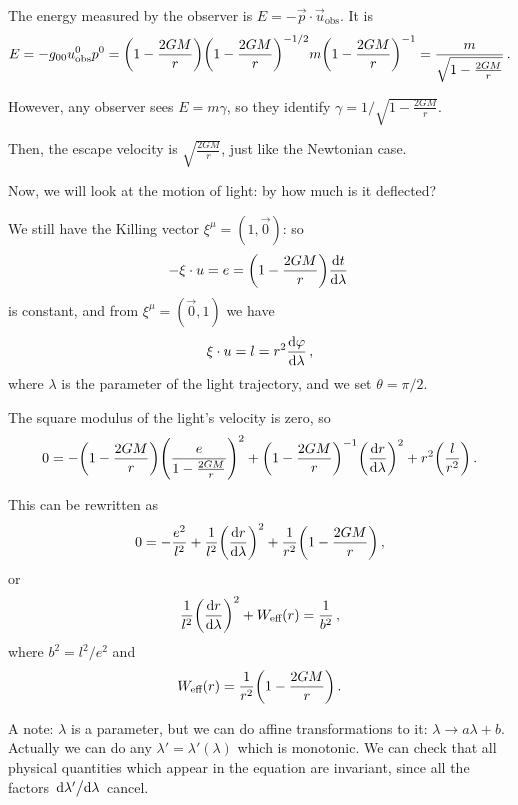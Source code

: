 \documentclass[main.tex]{subfiles}
\begin{document}
The energy measured by the observer is \(E = - \vec{p} \cdot \vec{u}_{\text{obs}}\). It is 
%
\begin{align}
  E = - g_{00} u^{0} _{\text{obs}} p^{0}
  = \qty(1 - \frac{2GM}{r}) \qty(1 - \frac{2GM}{r})^{-1/2}
  m \qty(1 - \frac{2GM}{r})^{-1}
  = \frac{m}{\sqrt{1 - \frac{2GM}{r}}}
\,. 
\end{align}
%

However, any observer sees \(E = m \gamma \), so they identify \(\gamma = 1 / \sqrt{1 - \frac{2GM}{r}}\). 

Then, the escape velocity is \(\sqrt{\frac{2GM}{r}}\), just like the Newtonian case. 

Now, we will look at the motion of light: by how much is it deflected? 

We still have the Killing vector \(\xi^{\mu } = (1, \vec{0})\): so 
%
\begin{align}
  - \xi \cdot u = e = \qty(1 - \frac{2GM}{r}) \dv{t}{\lambda } 
\,
\end{align}
%
is constant, and from \(\xi^{\mu }= (\vec{0}, 1)\) we have 
%
\begin{align}
  \xi \cdot u =  l =
  r^2 \dv{\varphi }{\lambda }
\,,
\end{align}
%
where \(\lambda \) is the parameter of the light trajectory, and we set \(\theta = \pi /2\). 

The square modulus of the light's velocity is zero, so 
%
\begin{align}
  0 =
  - \qty(1 - \frac{2GM}{r}) \qty(\frac{e}{1-\frac{2GM}{r}})^2
  + \qty(1 - \frac{2GM}{r})^{-1} \qty(\dv{r}{\lambda })^2 + r^2 \qty(\frac{l}{r^2})
\,. 
\end{align}

This can be rewritten as 
%
\begin{align}
  0= - \frac{e^2}{l^2} + \frac{1}{l^2} \qty(\dv{r}{\lambda })^2 + \frac{1}{r^2} \qty(1 - \frac{2GM}{r})
\,,
\end{align}
%
or 
%
\begin{align}
  \frac{1}{l^2} \qty(\dv{r}{\lambda })^2 + W _{\text{eff}}(r) = \frac{1}{b^2}
\,,
\end{align}
%
where \(b^2 = l^2 / e^2\) and 
%
\begin{align}
  W _{\text{eff}} (r) = \frac{1}{r^2} \qty(1 - \frac{2GM}{r})
\,.
\end{align}

A note: \(\lambda \) is a parameter, but we can do affine transformations to it: \(\lambda \rightarrow a \lambda + b\). Actually we can do any \(\lambda' = \lambda' (\lambda )\) which is monotonic. 
We can check that all physical quantities which appear in the equation are invariant, since all the factors \(\dv*{\lambda ' }{\lambda }\) cancel. 
\end{document}
